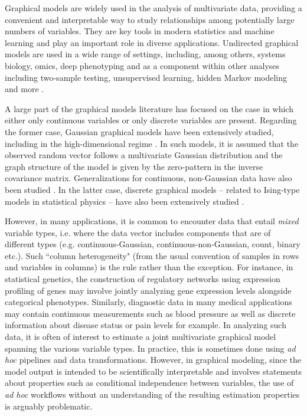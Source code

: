 Graphical models are widely used in the analysis of multivariate data, providing a convenient and interpretable way to study relationships among potentially large numbers of variables. They are key tools in modern statistics and machine learning and play an important role in diverse applications. Undirected graphical models are used in a wide range of settings, including, among others, systems biology, omics, deep phenotyping \citep[see, e.g.][]{dobra2004, Finegold11, monti2014}
and as a component within other analyses including two-sample testing, unsupervised learning, hidden Markov modeling and more  \citep[examples include][]{wei2007,verzelen2009,stadler2013, stadler2015,perrakis2021}.

A large part of the graphical models literature has focused on the case in which either only continuous variables or only discrete variables are present.
Regarding the former case, Gaussian graphical models have been extensively studied, including in the high-dimensional regime \citep[see among others][]{Meinshausen06, Friedman08, Banerjee08, Lam09, Yuan10, Ravikumar11, Cai11}. In such models, it is assumed that the observed random vector follows a multivariate Gaussian distribution and the graph structure of the model is given by the zero-pattern in the inverse covariance matrix. Generalizations for continuous, non-Gaussian data have also been studied \citep{Miyamura06, Liu09, Finegold11}. In the latter case, discrete graphical models -- related to Ising-type models in statistical physics -- have also been extensively studied \citep[see e.g.][]{wainwright2006, ravikumar2010}.

However, in many applications, it is common to encounter data that entail \textit{mixed} variable types, i.e. where the data vector includes components that are of different types (e.g. continuous-Gaussian, continuous-non-Gaussian, count, binary etc.). Such ``column heterogeneity" (from the usual convention of samples in rows and variables in columns) is the rule rather than the exception.
For instance, in statistical genetics, the construction of regulatory networks using expression profiling of genes may involve jointly analyzing gene expression levels alongside categorical phenotypes. Similarly, diagnostic data in many medical applications may contain continuous measurements such as blood pressure as well as discrete information about disease status or pain levels for example.
In analyzing such data, it is often of interest to estimate a joint multivariate graphical model spanning the various variable types. In practice, this is sometimes done using \textit{ad hoc} pipelines and data transformations. However, in graphical modeling, since the model output is intended to be scientifically interpretable and involves statements about properties such as conditional independence between variables, the use of \textit{ad hoc} workflows without an understanding of the resulting estimation properties is arguably problematic.

